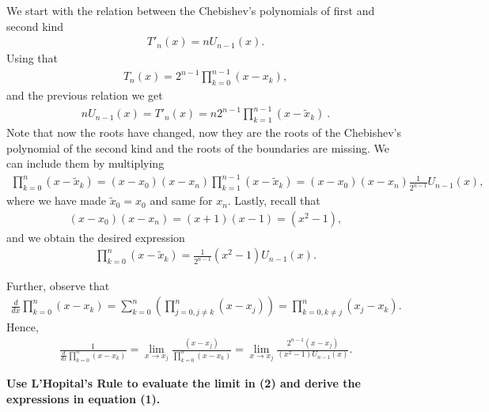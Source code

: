 We start with the relation between the Chebishev's polynomials of first and second kind
\begin{align*}
T'_n(x) = nU_{n-1}(x).
\end{align*}
Using that
\begin{align*}
T_n(x) = 2^{n-1}\prod_{k=0}^{n-1}(x - x_k),
\end{align*}
and the previous relation we get
\begin{align*}
nU_{n-1}(x) = T'_n(x) = n2^{n-1}\prod_{k=1}^{n-1}(x - \tilde{x}_k)~.
\end{align*}
Note that now the roots have changed, now they are the roots of the Chebishev's polynomial of the second kind and the roots of the boundaries are missing. We can include them by multiplying
\begin{align*}
\prod_{k=0}^{n}(x - \tilde{x}_k)=(x-x_0)(x-x_n)\prod_{k=1}^{n-1}(x - \tilde{x}_k) = (x-x_0)(x-x_n)\frac{1}{2^{n-1}}U_{n-1}(x),
\end{align*}
where we have made $\tilde{x}_0=x_0$ and same for $x_n$. Lastly, recall that 
\begin{align*}
(x-x_0)(x-x_n)=(x+1)(x-1)=(x^2-1),
\end{align*}
and we obtain the desired expression
\begin{align*}
\prod_{k=0}^{n}(x - \tilde{x}_k)= \frac{1}{2^{n-1}}(x^2-1)U_{n-1}(x).
\end{align*}

Further, observe that
\begin{align*}
\frac{d}{dx}\prod_{k=0}^{n}(x - x_k) = \sum_{k=0}^{n} \left( \prod_{j=0,j \neq k}^{n}(x - x_j) \right) = \prod_{k=0, k \neq j}^{n}(x_j - x_k).
\end{align*}
Hence,
\begin{align*}
 \frac{1}{\frac{d}{dx} \prod_{k=0}^{n}(x - x_k)} = \lim_{x \rightarrow x_j} \frac{(x - x_j)}{\prod_{k=0}^{n}(x - x_k)} = \lim_{x \rightarrow x_j} \frac{2^{n-1}(x-x_j)}{(x^2 - 1)U_{n-1}(x)}.
\end{align*}

\textbf{Use L'Hopital's Rule to evaluate the limit in (2) and derive the expressions in equation (1).}

